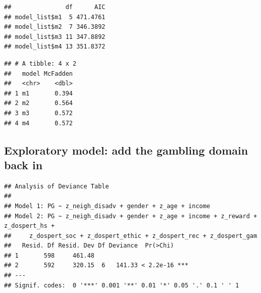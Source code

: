 \documentclass[
]{article}
\newenvironment{Shaded}{\begin{snugshade}}{\end{snugshade}}
\newcommand{\AttributeTok}[1]{\textcolor[rgb]{0.13,0.29,0.53}{#1}}
\newcommand{\FunctionTok}[1]{\textcolor[rgb]{0.13,0.29,0.53}{\textbf{#1}}}
\newcommand{\NormalTok}[1]{#1}
\newcommand{\OtherTok}[1]{\textcolor[rgb]{0.56,0.35,0.01}{#1}}
\newcommand{\SpecialCharTok}[1]{\textcolor[rgb]{0.81,0.36,0.00}{\textbf{#1}}}
\newcommand{\StringTok}[1]{\textcolor[rgb]{0.31,0.60,0.02}{#1}}
\begin{document}
\begin{verbatim}
##               df      AIC
## model_list$m1  5 471.4761
## model_list$m2  7 346.3892
## model_list$m3 11 347.8892
## model_list$m4 13 351.8372
\end{verbatim}

\begin{Shaded}
\end{Shaded}

\begin{verbatim}
## # A tibble: 4 x 2
##   model McFadden
##   <chr>    <dbl>
## 1 m1       0.394
## 2 m2       0.564
## 3 m3       0.572
## 4 m4       0.572
\end{verbatim}

\subsection{Exploratory model: add the gambling domain back
in}\label{exploratory-model-add-the-gambling-domain-back-in}

\begin{Shaded}
\end{Shaded}

\begin{verbatim}
## Analysis of Deviance Table
## 
## Model 1: PG ~ z_neigh_disadv + gender + z_age + income
## Model 2: PG ~ z_neigh_disadv + gender + z_age + income + z_reward + z_dospert_hs + 
##     z_dospert_soc + z_dospert_ethic + z_dospert_rec + z_dospert_gam
##   Resid. Df Resid. Dev Df Deviance  Pr(>Chi)    
## 1       598     461.48                          
## 2       592     320.15  6   141.33 < 2.2e-16 ***
## ---
## Signif. codes:  0 '***' 0.001 '**' 0.01 '*' 0.05 '.' 0.1 ' ' 1
\end{verbatim}
\end{document}
